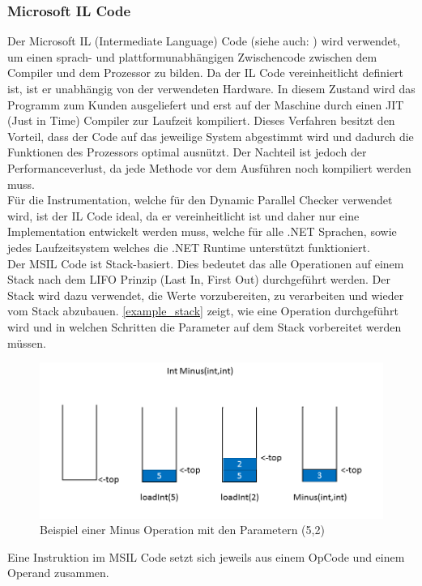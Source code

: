 \documentclass[10pt,a4paper]{article}
\begin{document}
\subsubsection{Microsoft IL Code}\label{chapter_IL}
Der Microsoft IL (Intermediate Language) Code (siehe auch: \cite{ecma}) wird verwendet, um einen sprach- und plattformunabhängigen Zwischencode zwischen dem Compiler und dem Prozessor zu bilden. Da der IL Code vereinheitlicht definiert ist, ist er unabhängig von der verwendeten Hardware. In diesem Zustand wird das Programm zum Kunden ausgeliefert und erst auf der Maschine durch einen JIT (Just in Time) Compiler zur Laufzeit kompiliert. Dieses Verfahren besitzt den Vorteil, dass der Code auf das jeweilige System abgestimmt wird und dadurch die Funktionen des Prozessors optimal ausnützt. Der Nachteil ist jedoch der Performanceverlust, da jede Methode vor dem Ausführen noch kompiliert werden muss.\\
Für die Instrumentation, welche für den Dynamic Parallel Checker verwendet wird, ist der IL Code ideal, da er vereinheitlicht ist und daher nur eine Implementation entwickelt werden muss, welche für alle .NET Sprachen, sowie jedes Laufzeitsystem welches die .NET Runtime unterstützt funktioniert.\\
Der MSIL Code ist Stack-basiert. Dies bedeutet das alle Operationen auf einem Stack nach dem LIFO Prinzip (Last In, First Out) durchgeführt werden. Der Stack wird dazu verwendet, die Werte vorzubereiten, zu verarbeiten und wieder vom Stack abzubauen. \autoref{example_stack} zeigt, wie eine Operation durchgeführt wird und in welchen Schritten die Parameter auf dem Stack vorbereitet werden müssen.\\
\begin{figure}[H]
\centering
\includegraphics[scale=0.5]{images/BeispielStack.png}
\caption{Beispiel einer Minus Operation mit den Parametern (5,2)}
\label{example_stack}
\end{figure}
Eine Instruktion im MSIL Code setzt sich jeweils aus einem OpCode und einem Operand zusammen.
\end{document}
